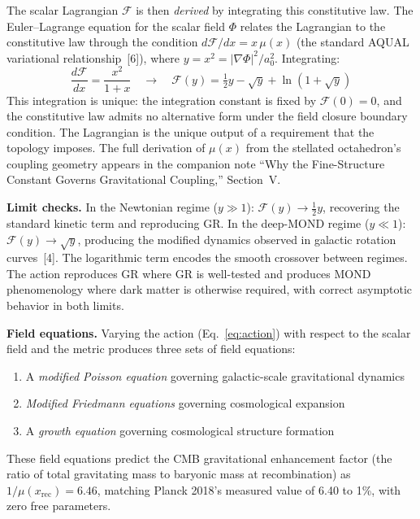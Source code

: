 \documentclass[11pt]{article}
\begin{document}
The scalar Lagrangian $\mathcal{F}$ is then \emph{derived} by integrating this constitutive law.
The Euler--Lagrange equation for the scalar field $\Phi$ relates the Lagrangian to the constitutive law through the condition $d\mathcal{F}/dx = x\,\mu(x)$ (the standard AQUAL variational relationship~[6]), where $y = x^2 = |\nabla\Phi|^2/a_0^2$.
Integrating:
\begin{equation}
\frac{d\mathcal{F}}{dx} = \frac{x^2}{1+x} \quad\longrightarrow\quad \mathcal{F}(y) = \tfrac{1}{2}y - \sqrt{y} + \ln(1 + \sqrt{y})
\label{eq:lagrangian}
\end{equation}
This integration is unique: the integration constant is fixed by $\mathcal{F}(0) = 0$, and the constitutive law admits no alternative form under the field closure boundary condition.
The Lagrangian is the unique output of a requirement that the topology imposes.
The full derivation of $\mu(x)$ from the stellated octahedron's coupling geometry appears in the companion note ``Why the Fine-Structure Constant Governs Gravitational Coupling,'' Section~V.

\textbf{Limit checks.}\quad
In the Newtonian regime ($y \gg 1$): $\mathcal{F}(y) \to \tfrac{1}{2}y$, recovering the standard kinetic term and reproducing GR.
In the deep-MOND regime ($y \ll 1$): $\mathcal{F}(y) \to \sqrt{y}$, producing the modified dynamics observed in galactic rotation curves~[4].
The logarithmic term encodes the smooth crossover between regimes.
The action reproduces GR where GR is well-tested and produces MOND phenomenology where dark matter is otherwise required, with correct asymptotic behavior in both limits.

\textbf{Field equations.}\quad
Varying the action (Eq.~\ref{eq:action}) with respect to the scalar field and the metric produces three sets of field equations:
\begin{enumerate}[leftmargin=2em]
\item A \emph{modified Poisson equation} governing galactic-scale gravitational dynamics
\item \emph{Modified Friedmann equations} governing cosmological expansion
\item A \emph{growth equation} governing cosmological structure formation
\end{enumerate}
These field equations predict the CMB gravitational enhancement factor (the ratio of total gravitating mass to baryonic mass at recombination) as $1/\mu(x_{\text{rec}}) = 6.46$, matching Planck 2018's measured value of 6.40 to 1\%, with zero free parameters.
\end{document}
